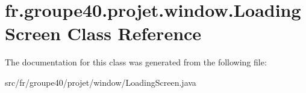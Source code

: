 \hypertarget{classfr_1_1groupe40_1_1projet_1_1window_1_1_loading_screen}{}\section{fr.\+groupe40.\+projet.\+window.\+Loading\+Screen Class Reference}
\label{classfr_1_1groupe40_1_1projet_1_1window_1_1_loading_screen}


The documentation for this class was generated from the following file\+:\begin{DoxyCompactItemize}
\item 
src/fr/groupe40/projet/window/Loading\+Screen.\+java\end{DoxyCompactItemize}
